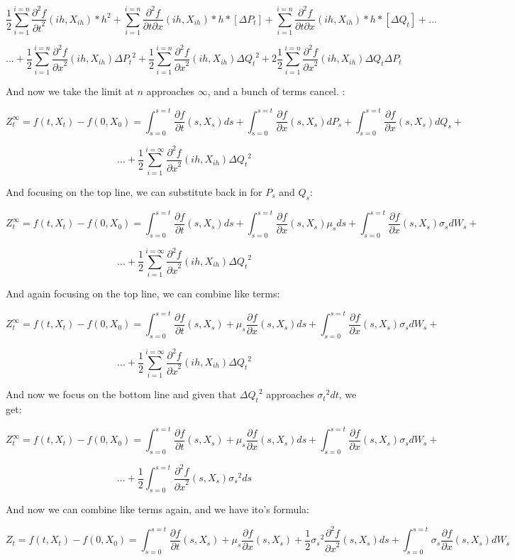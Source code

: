 \documentclass{article}
\begin{document}
$$ \frac{1}{2}\sum_{i=1}^{i = n}\frac{\partial^2 f}{{\partial t}^2}(ih,X_{ih}) * {h}^2 + \sum_{i=1}^{i = n} \frac{\partial^2 f}{\partial t \partial x}(ih,X_{ih}) *h*[\Delta P_t]  + \sum_{i=1}^{i = n} \frac{\partial^2 f}{\partial t \partial x}(ih,X_{ih}) *h*[ \Delta Q_t]+ ... $$



$$...  + \frac{1}{2}\sum_{i=1}^{i = n}\frac{\partial^2 f}{{\partial x}^2}(ih,X_{ih}) {\Delta P_t}^2 + \frac{1}{2}\sum_{i=1}^{i = n}\frac{\partial^2 f}{{\partial x}^2}(ih,X_{ih}){\Delta Q_t}^2 + 2\frac{1}{2}\sum_{i=1}^{i = n}\frac{\partial^2 f}{{\partial x}^2}(ih,X_{ih})\Delta Q_t \Delta P_t$$

And now we take the limit at $n$ approaches $\infty$, and a bunch of terms cancel. :


$$Z_t^\infty = f(t,X_t) - f(0,X_0) = \int_{s=0}^{s=t} \frac{\partial f}{\partial t}(s,X_s) ds + \int_{s=0}^{s=t}\frac{\partial f}{\partial x}(s,X_s) d P_s + \int_{s=0}^{s=t}\frac{\partial f}{\partial x}(s,X_s) d Q_s +  $$


$$...  +  \frac{1}{2}\sum_{i=1}^{i = \infty}\frac{\partial^2 f}{{\partial x}^2}(ih,X_{ih}){\Delta Q_t}^2 $$

And focusing on the top line, we can substitute back in for $P_s$ and $Q_s$:


$$Z_t^\infty = f(t,X_t) - f(0,X_0) = \int_{s=0}^{s=t} \frac{\partial f}{\partial t}(s,X_s) ds + \int_{s=0}^{s=t}\frac{\partial f}{\partial x}(s,X_s) \mu_s d s + \int_{s=0}^{s=t}\frac{\partial f}{\partial x}(s,X_s) \sigma_sdW_s +  $$


$$...  +  \frac{1}{2}\sum_{i=1}^{i = \infty}\frac{\partial^2 f}{{\partial x}^2}(ih,X_{ih}){\Delta Q_t}^2 $$

And again focusing on the top line, we can combine like terms:

$$Z_t^\infty = f(t,X_t) - f(0,X_0) = \int_{s=0}^{s=t} \frac{\partial f}{\partial t}(s,X_s) + \mu_s \frac{\partial f}{\partial x}(s,X_s)  ds + \int_{s=0}^{s=t}\frac{\partial f}{\partial x}(s,X_s) \sigma_sdW_s +  $$


$$...  +  \frac{1}{2}\sum_{i=1}^{i = \infty}\frac{\partial^2 f}{{\partial x}^2}(ih,X_{ih}){\Delta Q_t}^2 $$

And now we focus on the bottom line and given that ${\Delta Q_t}^2$ approaches ${\sigma _t}^2dt$, we get:


$$Z_t^\infty = f(t,X_t) - f(0,X_0) = \int_{s=0}^{s=t} \frac{\partial f}{\partial t}(s,X_s) + \mu_s \frac{\partial f}{\partial x}(s,X_s)  ds + \int_{s=0}^{s=t}\frac{\partial f}{\partial x}(s,X_s) \sigma_sdW_s +  $$


$$...  +  \frac{1}{2}\int_{s=0}^{s=t}\frac{\partial^2 f}{{\partial x}^2}(s,X_s) {\sigma _s}^2 ds $$

And now we can combine like terms again, and we have ito's formula:


$$Z_t = f(t,X_t) - f(0,X_0) = \int_{s=0}^{s=t} \frac{\partial f}{\partial t}(s,X_s) + \mu_s \frac{\partial f}{\partial x}(s,X_s) + \frac{1}{2}{\sigma _s}^2\frac{\partial^2 f}{{\partial x}^2}(s,X_s)  ds + \int_{s=0}^{s=t}\sigma_s\frac{\partial f}{\partial x}(s,X_s) dW_s   $$
\end{document}
